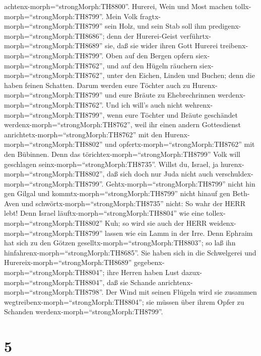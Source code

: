 achtenx-morph=``strongMorph:TH8800''.  Hurerei, Wein und
Most machen tollx-morph=``strongMorph:TH8799''.  Mein Volk
fragtx-morph=``strongMorph:TH8799'' sein Holz, und sein Stab soll ihm
predigenx-morph=``strongMorph:TH8686''; denn der Hurerei-Geist
verführtx-morph=``strongMorph:TH8689'' sie, daß sie wider ihren Gott
Hurerei treibenx-morph=``strongMorph:TH8799''.  Oben auf
den Bergen opfern siex-morph=``strongMorph:TH8762'', und auf den Hügeln
räuchern siex-morph=``strongMorph:TH8762'', unter den Eichen, Linden und
Buchen; denn die haben feinen Schatten. Darum werden eure Töchter auch
zu Hurenx-morph=``strongMorph:TH8799'' und eure Bräute zu Ehebrechrinnen
werdenx-morph=``strongMorph:TH8762''.  Und ich will's auch
nicht wehrenx-morph=``strongMorph:TH8799'', wenn eure Töchter und Bräute
geschändet werdenx-morph=``strongMorph:TH8762'', weil ihr einen andern
Gottesdienst anrichtetx-morph=``strongMorph:TH8762'' mit den
Hurenx-morph=``strongMorph:TH8802'' und
opfertx-morph=``strongMorph:TH8762'' mit den Bübinnen. Denn das
törichtex-morph=``strongMorph:TH8799'' Volk will geschlagen
seinx-morph=``strongMorph:TH8735''.  Willst du, Israel, ja
hurenx-morph=``strongMorph:TH8802'', daß sich doch nur Juda nicht auch
verschuldex-morph=``strongMorph:TH8799''.
Gehtx-morph=``strongMorph:TH8799'' nicht hin gen Gilgal und
kommtx-morph=``strongMorph:TH8799'' nicht hinauf gen Beth-Aven und
schwörtx-morph=``strongMorph:TH8735'' nicht: So wahr der HERR lebt!
 Denn Israel läuftx-morph=``strongMorph:TH8804'' wie eine
tollex-morph=``strongMorph:TH8802'' Kuh; so wird sie auch der HERR
weidenx-morph=``strongMorph:TH8799'' lassen wie ein Lamm in der Irre.
 Denn Ephraim hat sich zu den Götzen
geselltx-morph=``strongMorph:TH8803''; so laß ihn
hinfahrenx-morph=``strongMorph:TH8685''.  Sie haben sich in
die Schwelgerei und Hurereix-morph=``strongMorph:TH8689''
gegebenx-morph=``strongMorph:TH8804''; ihre Herren haben Lust
dazux-morph=``strongMorph:TH8804'', daß sie Schande
anrichtenx-morph=``strongMorph:TH8798''.  Der Wind mit
seinen Flügeln wird sie zusammen
wegtreibenx-morph=``strongMorph:TH8804''; sie müssen über ihrem Opfer zu
Schanden werdenx-morph=``strongMorph:TH8799''.

\hypertarget{section-4}{%
\section{5}\label{section-4}}

